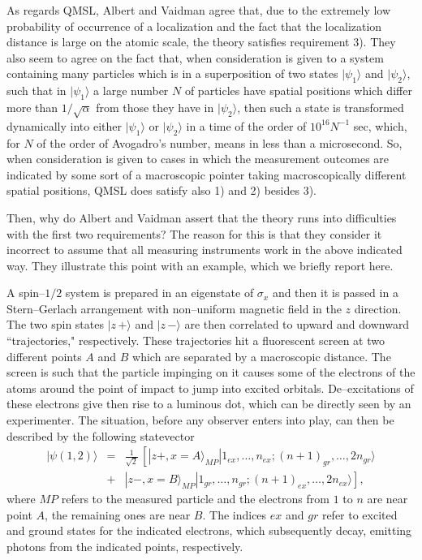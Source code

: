 \documentclass[10pt,a4paper]{article}
\begin{document}
As regards QMSL, Albert and Vaidman agree that, due to the
extremely low probability of occurrence of a localization and the
fact that the localization distance is large on the atomic scale,
the theory satisfies requirement 3). They also seem to agree on
the fact that, when consideration is given to a system containing
many particles which is in a superposition of two states
$|\psi_{1}\rangle$ and $|\psi_{2}\rangle$, such that in
$|\psi_{1}\rangle$ a large number $N$ of particles have spatial
positions which differ more than $1/\sqrt{\alpha}$ from those they
have in $|\psi_{2}\rangle$, then such a state is transformed
dynamically into either $|\psi_{1}\rangle$ or $|\psi_{2}\rangle$
in a time of the order of $10^{16} N^{-1}$ sec, which, for $N$ of
the order of Avogadro's number, means in less than a microsecond.
So, when consideration is given to cases in which the measurement
outcomes are indicated by some sort of a macroscopic pointer
taking macroscopically different spatial positions, QMSL does
satisfy also 1) and 2) besides 3).

Then, why do Albert and Vaidman assert that the theory runs into
difficulties with the first two requirements? The reason for this
is that they consider it  incorrect to assume that all measuring
instruments work in the above indicated way. They illustrate this
point with an example, which we briefly report here.

A spin--$1/2$ system is prepared in an eigenstate of $\sigma_{x}$
and then it is passed in a Stern--Gerlach arrangement with
non--uniform magnetic field in the $z$ direction. The two spin
states $|z\,+\rangle$ and $|z\,-\rangle$ are then correlated to
upward and downward ``trajectories," respectively. These
trajectories hit a fluorescent screen  at two different
points $A$ and $B$ which are separated by a macroscopic distance.
The screen is such that the particle impinging on it causes some
of the electrons of the atoms around the point of impact to jump
into excited orbitals. De--excitations of these electrons give
then rise to a luminous dot, which can be directly seen by an
experimenter. The situation, before any observer enters into play,
can then be described by the following statevector
\begin{eqnarray} \label{rsp}
|\psi(1,2)\rangle & = & \frac{1}{\sqrt{2}}\,\left[ |z+,
x=A\rangle_{MP} |1_{ex}, \ldots, n_{ex}; (n+1)_{gr}, \ldots,
2n_{gr}\rangle
\right.\nonumber \\
& + & \left. |z-, x=B\rangle_{MP} |1_{gr}, \ldots, n_{gr};
(n+1)_{ex}, \ldots, 2n_{ex}\rangle \right],
\end{eqnarray}
where $MP$ refers to the measured particle and the electrons from
$1$ to $n$ are near point $A$, the remaining ones are near $B$.
The indices $ex$ and $gr$ refer to excited and ground states for
the indicated electrons, which subsequently decay, emitting
photons from the indicated points, respectively.
\end{document}
